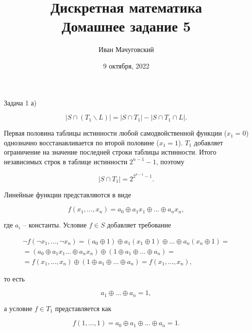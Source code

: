 \documentclass{article}
\date{9 октября, 2022}
\title{Дискретная математика \\ \Large Домашнее задание 5}
\author{Иван Мачуговский}
\newcommand{\abs}[1]{\left\lvert#1\right\rvert}
\renewcommand{\setminus}{\mathbin{\backslash}}
\begin{document}
	\maketitle

	\begin{section}{Задача 1}
		а)

		\begin{equation*}
			\abs{S \cap (T_1 \setminus L)} = \abs{S \cap T_1} - \abs{S \cap T_1 \cap L}.
		\end{equation*}

		Первая половина таблицы истинности любой самодвойственной функции ($x_1 = 0$) однозначно восстанавливается по второй половине ($x_1 = 1$). $T_1$ добавляет ограничение на значение последней строки таблицы истинности. Итого независимых строк в таблице истинности $2^{n-1}-1$, поэтому

		\begin{equation*}
			\abs{S \cap T_1} = 2^{2^{n-1}-1}.
		\end{equation*}

		Линейные функции представляются в виде

		\begin{equation*}
			f(x_1, \dots, x_n) = a_0 \oplus a_1 x_1 \oplus \dots \oplus a_n x_n,
		\end{equation*}

		где $a_i$ -- константы. Условие $f \in S$ добавляет требование

		\begin{multline*}
			\neg f(\neg x_1, \dots, \neg x_n) = (a_0 \oplus 1) \oplus a_1 (x_1 \oplus 1) \oplus \dots \oplus a_n (x_n \oplus 1) = \\
			= (a_0 \oplus a_1 x_1 \dots \oplus a_n x_n) \oplus (1 \oplus a_1 \oplus \dots \oplus a_n) = \\
			= f(x_1, \dots, x_n) \oplus (1 \oplus a_1 \oplus \dots \oplus a_n) = f(x_1, \dots, x_n),
		\end{multline*}

		то есть

		\begin{equation*}
			a_1 \oplus \dots \oplus a_n = 1,
		\end{equation*}

		а условие $f \in T_1$ представляется как

		\begin{equation*}
			f(1, \dots, 1) = a_0 \oplus a_1 \oplus \dots \oplus a_n = 1.
		\end{equation*}


\end{section}
\end{document}
